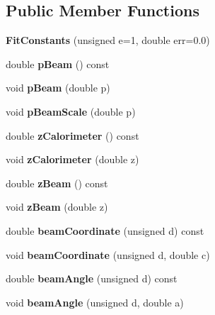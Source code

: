 \subsection*{Public Member Functions}
\begin{DoxyCompactItemize}
\item 
{\bfseries FitConstants} (unsigned e=1, double err=0.0)\label{classTBTrack_1_1FitConstants_a47ddb6700da0d5c104eb0c369d80911e}

\item 
double {\bfseries pBeam} () const \label{classTBTrack_1_1FitConstants_a133ea6b18d89af235a741119259e0dbb}

\item 
void {\bfseries pBeam} (double p)\label{classTBTrack_1_1FitConstants_a9ce9a2d41aa782c4298a72d5c0eb209c}

\item 
void {\bfseries pBeamScale} (double p)\label{classTBTrack_1_1FitConstants_a6af5bc62244d18b251e7954368ecb9c9}

\item 
double {\bfseries zCalorimeter} () const \label{classTBTrack_1_1FitConstants_acdbec3521ff0b24abf68178cc2f2618b}

\item 
void {\bfseries zCalorimeter} (double z)\label{classTBTrack_1_1FitConstants_af8a150ebd1d2265be0a0640aa58fac87}

\item 
double {\bfseries zBeam} () const \label{classTBTrack_1_1FitConstants_a4375d97e5d050aebd2b9462bbf215c75}

\item 
void {\bfseries zBeam} (double z)\label{classTBTrack_1_1FitConstants_afe66619121004ae499b40341e0d78eaf}

\item 
double {\bfseries beamCoordinate} (unsigned d) const \label{classTBTrack_1_1FitConstants_ad67c0f98da288bdaa426ee94a25056e1}

\item 
void {\bfseries beamCoordinate} (unsigned d, double c)\label{classTBTrack_1_1FitConstants_a999f0fc68f7ddbf17fa49fc77b2ca542}

\item 
double {\bfseries beamAngle} (unsigned d) const \label{classTBTrack_1_1FitConstants_ada6619cbead5a277f3a99df287094fb5}

\item 
void {\bfseries beamAngle} (unsigned d, double a)\label{classTBTrack_1_1FitConstants_a52e266c03c76f8bc27b2eae2f731618d}


\end{DoxyCompactItemize}
